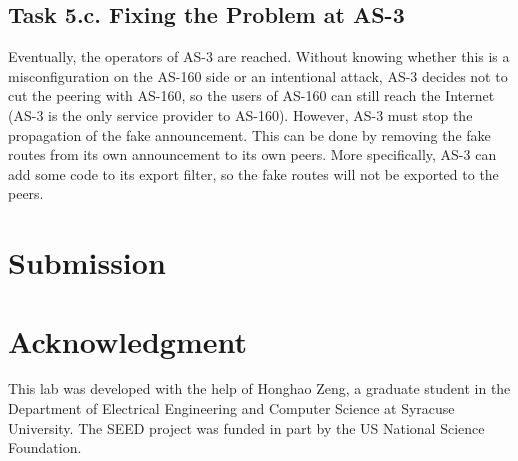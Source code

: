 \subsection{Task 5.c. Fixing the Problem at AS-3} 

Eventually, the operators of AS-3 are reached. Without knowing 
whether this is a misconfiguration on the AS-160 side or an intentional
attack, AS-3 decides not to cut the peering with AS-160, so the users 
of AS-160 can still reach the Internet (AS-3 is the only service 
provider to AS-160). However, AS-3 must stop the propagation of the 
fake announcement. This can be done by removing the 
fake routes from its own announcement to its own peers.
More specifically, AS-3 can add some code to its export 
filter, so the fake routes will not be exported to
the peers.


\section{Submission}





\section*{Acknowledgment} 

This lab was developed with the help of Honghao Zeng, 
a graduate student in the Department of Electrical Engineering 
and Computer Science at Syracuse University. 
The SEED project was funded in part 
by the US National Science Foundation. 







